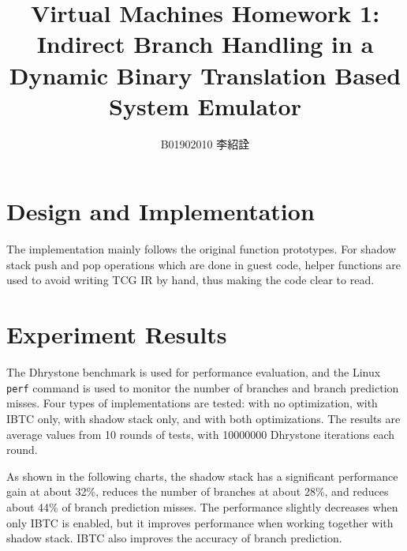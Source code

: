 \documentclass[11pt,a4paper]{article}
\title{Virtual Machines Homework 1: Indirect Branch Handling in a Dynamic Binary Translation Based System Emulator}
\author{B01902010 李紹詮}
\date{}
\begin{document}
\maketitle
\thispagestyle{fancy}

\section{Design and Implementation}
The implementation mainly follows the original function prototypes. For shadow
stack push and pop operations which are done in guest code, helper functions
are used to avoid writing TCG IR by hand, thus making the code clear to read.

\section{Experiment Results}
The Dhrystone benchmark is used for performance evaluation, and the Linux
\texttt{perf} command is used to monitor the number of branches and branch
prediction misses. Four types of implementations are tested: with no
optimization, with IBTC only, with shadow stack only, and with both
optimizations. The results are average values from 10 rounds of tests, with
10000000 Dhrystone iterations each round.

As shown in the following charts, the shadow stack has a significant performance
gain at about 32\%, reduces the number of branches at about 28\%, and reduces
about 44\% of branch prediction misses.
The performance slightly decreases when only IBTC is enabled, but it improves
performance when working together with shadow stack. IBTC also improves the
accuracy of branch prediction.

\begin{center}
\end{center}
\end{document}
